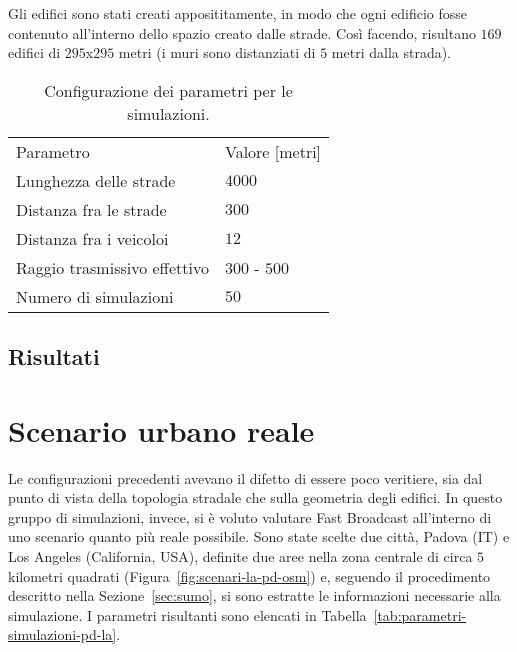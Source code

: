 Gli edifici sono stati creati apposititamente, in modo che ogni edificio fosse contenuto all'interno dello spazio creato dalle strade.
Così facendo, risultano $169$ edifici di $295$x$295$ metri (i muri sono distanziati di $5$ metri dalla strada).
%
\begin{table}[htbp]
	\centering
	\begin{tabular}{| m{.4\linewidth} | p{.2\linewidth} |}
		\toprule
		Parametro											&			Valore [metri]			\\
		\thickerline
		Lunghezza delle strade				&			$4000$							\\
		Distanza fra le strade				&			$300$								\\
		Distanza fra i veicoloi 			&			$12$ 								\\
		Raggio trasmissivo effettivo	&			$300$ - $500$				\\
		Numero di simulazioni					&			$50$								\\
		\bottomrule
	\end{tabular}
	\caption{Configurazione dei parametri per le simulazioni.\label{tab:parametri-simulazioni-barichello}}
\end{table}
%
%
\subsection{Risultati}\label{sec:configurazione-griglia-risultati}
%
%
\section{Scenario urbano reale} %
Le configurazioni precedenti avevano il difetto di essere poco veritiere, sia dal punto di vista della topologia stradale
che sulla geometria degli edifici.
In questo gruppo di simulazioni, invece, si è voluto valutare Fast Broadcast all'interno di uno scenario quanto più reale possibile.
Sono state scelte due città, Padova (IT) e Los Angeles (California, USA), definite due aree nella zona centrale di circa $5$ kilometri quadrati (Figura~\ref{fig:scenari-la-pd-osm})
e, seguendo il procedimento descritto nella Sezione~\ref{sec:sumo}, si sono estratte le informazioni necessarie alla simulazione.
I parametri risultanti sono elencati in Tabella~\ref{tab:parametri-simulazioni-pd-la}.


